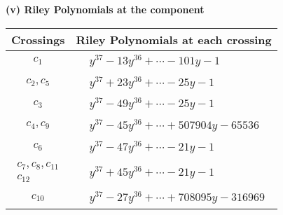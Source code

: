 \documentclass[1p]{elsarticle_modified}
\theoremstyle{definition}
\begin{document}
\newpage\renewcommand{\arraystretch}{1}
\flushleft \textbf{(v) Riley Polynomials at the component}\newline \\
\begin{tabular}{m{50pt}|m{274pt}}
Crossings & \hspace{64pt}Riley Polynomials at each crossing \\
\hline $$\begin{aligned}c_{1}\end{aligned}$$&$\begin{aligned}
&y^{37}-13 y^{36}+\cdots-101 y-1
\end{aligned}$\\
\hline $$\begin{aligned}c_{2},c_{5}\end{aligned}$$&$\begin{aligned}
&y^{37}+23 y^{36}+\cdots-25 y-1
\end{aligned}$\\
\hline $$\begin{aligned}c_{3}\end{aligned}$$&$\begin{aligned}
&y^{37}-49 y^{36}+\cdots-25 y-1
\end{aligned}$\\
\hline $$\begin{aligned}c_{4},c_{9}\end{aligned}$$&$\begin{aligned}
&y^{37}-45 y^{36}+\cdots+507904 y-65536
\end{aligned}$\\
\hline $$\begin{aligned}c_{6}\end{aligned}$$&$\begin{aligned}
&y^{37}-47 y^{36}+\cdots-21 y-1
\end{aligned}$\\
\hline $$\begin{aligned}c_{7},c_{8},c_{11}\\c_{12}\end{aligned}$$&$\begin{aligned}
&y^{37}+45 y^{36}+\cdots-21 y-1
\end{aligned}$\\
\hline $$\begin{aligned}c_{10}\end{aligned}$$&$\begin{aligned}
&y^{37}-27 y^{36}+\cdots+708095 y-316969
\end{aligned}$\\
\hline
\end{tabular}\\~\\
\end{document}
